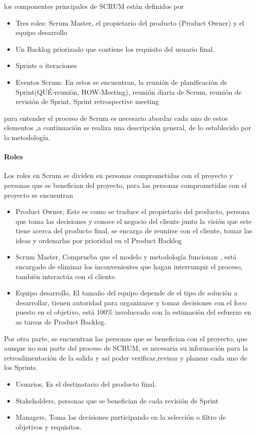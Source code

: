 los componentes principales de SCRUM están definidos por 
\begin{itemize}
    \item Tres roles: Scrum Master, el propietario del producto (Product Owner) y el equipo desarrollo
    \item Un Backlog priorizado que contiene los requisito del usuario final.
    \item Sprints o iteraciones
    \item Eventos Scrum: En estos se encuentran, la reunión de planificación de Sprint(QUÉ-reunión, HOW-Meeting), reunión diaria de Scrum, reunión de revisión de Sprint, Sprint retrospective meeting 
\end{itemize}

para entender el proceso de Scrum es necesario abordar cada uno de estos elementos ,a continuación se realiza una descripción general, de lo establecido por la metodología. 

\paragraph{Roles}
Los roles en Scrum se dividen en personas comprometidas con el proyecto y personas que se benefician del proyecto, para las personas comprometidas con el proyecto se encuentran
\begin{itemize}
    \item Product Owner, Este es como se traduce el propietario del producto, persona que toma las decisiones y conoce el negocio del cliente junto la visión que este tiene acerca del producto final, se encarga de reunirse con el cliente, tomar las ideas y ordenarlas por prioridad en el Product Backlog
     \item Scrum Master, Comprueba que el modelo y metodología funcionan , está encargado de eliminar los inconvenientes que hagan interrumpir el proceso, también interactúa con el cliente.
     \item Equipo desarrollo, El tamaño del equipo depende de el tipo de solución a desarrollar, tienen autoridad para organizarse y tomar decisiones con el foco puesto en el objetivo, está 100\% involucrado con la estimación del esfuerzo en as tareas de Product Backlog.
\end{itemize}

Por otra parte, se encuentran las personas que se benefician con el proyecto, que aunque no son parte del proceso de SCRUM, es necesaria su información para la retroalimentación de la salida y así poder verificar,revisar y planear cada uno de los Sprints.
\begin{itemize}
    \item Usuarios, Es el destinatario del producto final. 
    \item Stakeholders, personas que se benefician de cada revisión de Sprint
    \item Managers, Toma las decisiones participando en la selección o filtro de objetivos y requisitos. 
\end{itemize}

